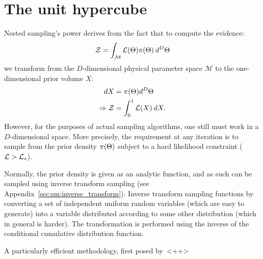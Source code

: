 \chapter{The unit hypercube}
\label{chap:hc}


Nested sampling's power derives from the fact that to compute the evidence:
\begin{equation}
  \mathcal{Z} = \int_\mathcal{M} \mathcal{L}(\Theta) \pi(\Theta)\: d^D\Theta
  \label{eqn:hc:evidence}
\end{equation}
we transform from the $D$-dimensional physical parameter space $\mathcal{M}$ to the one-dimensional prior volume $X$:
\begin{align}
  dX &= \pi(\Theta)d^D\Theta
  \label{eqn:hc:prior_vol_def} \\
  \Rightarrow \mathcal{Z} &= \int_0^1 \mathcal{L}(X) \: dX.
\end{align}
However, for the purposes of actual sampling algorithms, one still must work in a $D$-dimensional space. More precisely, the requirement at any iteration is to sample from the prior density $\pi(\Theta)$ subject to a hard likelihood constraint ($\mathcal{L}>\mathcal{L}_\ast$). 

Normally, the prior density is given as an analytic function, and as such can be sampled using inverse transform sampling (see Appendix~\ref{sec:sm:inverse_transform}). Inverse transform sampling functions by converting a set of independent uniform random variables (which are easy to generate) into a variable distributed according to some other distribution (which in general is harder). The transformation is performed using the inverse of the conditional cumulative distribution function. 

A particularly efficient methodology, first posed by~\cite{}<++>

